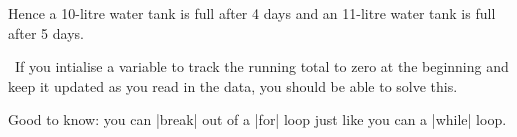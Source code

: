 Hence a 10-litre water tank is full after 4 days and an 11-litre water tank is full after
5 days.

\Scratch\ If you intialise a variable to track the running total to zero at the beginning
and keep it updated as you read in the data, you should be able to solve this.

Good to know: you can \pycode|break| out of a \pycode|for| loop just like you can a
\pycode|while| loop.

